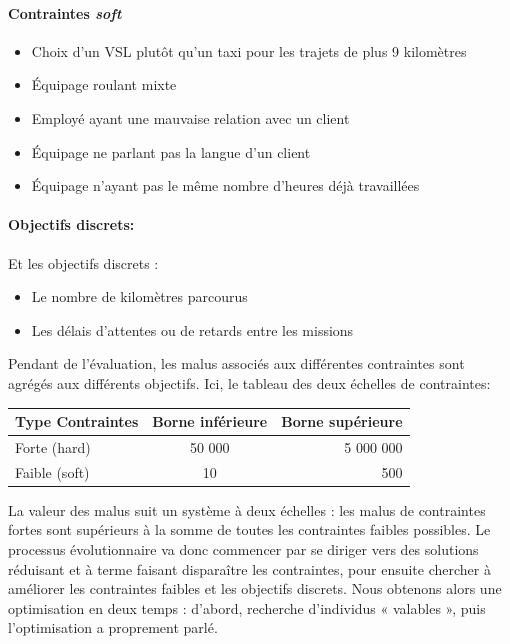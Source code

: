 \documentclass[french, 11pt]{memoir}
\begin{document}
\paragraph{Contraintes \emph{soft}}\label{contraintes-soft}


\begin{itemize}
\item
  Choix d'un VSL plutôt qu'un taxi pour les trajets de plus 9 kilomètres
\item
  Équipage roulant mixte
\item
  Employé ayant une mauvaise relation avec un client
\item
  Équipage ne parlant pas la langue d'un client
\item
  Équipage n'ayant pas le même nombre d'heures déjà travaillées
\end{itemize}

\paragraph{Objectifs discrets:}\label{objectifs-discrets}

Et les objectifs discrets :

\begin{itemize}
\item
  Le nombre de kilomètres parcourus
\item
  Les délais d'attentes ou de retards entre les missions
\end{itemize}

Pendant de l'évaluation, les malus associés aux différentes contraintes
sont agrégés aux différents objectifs. Ici, le tableau des deux échelles
de contraintes:

\begin{center}
\begin{tabular}{ |l| c| r| }
		\hline
	Type Contraintes & Borne inférieure & Borne supérieure \\
	\hline
	Forte (hard) & 50 000 & 5 000 000 \\
	Faible (soft) & 10 & 500 \\
		\hline
\end{tabular}
\end{center}

La valeur des malus suit un système à deux échelles : les malus de
contraintes fortes sont supérieurs à la somme de toutes les contraintes
faibles possibles. Le processus évolutionnaire va donc commencer par se
diriger vers des solutions réduisant et à terme faisant disparaître les
contraintes, pour ensuite chercher à améliorer les contraintes faibles
et les objectifs discrets. Nous obtenons alors une optimisation en deux
temps : d'abord, recherche d'individus « valables », puis l'optimisation
a proprement parlé.
\end{document}
